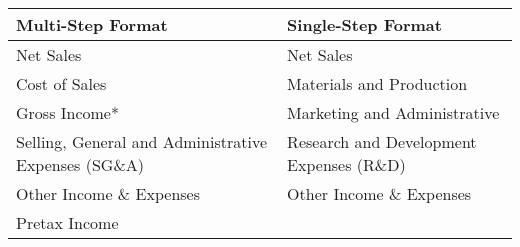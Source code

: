 \documentclass[]{book}
\theoremstyle{definition}
\theoremstyle{definition}
\theoremstyle{definition}
\theoremstyle{remark}
\begin{document}
\begin{longtable}[]{@{}ll@{}}
\toprule
\begin{minipage}[b]{0.18\columnwidth}\raggedright\strut
Multi-Step Format\strut
\end{minipage} & \begin{minipage}[b]{0.18\columnwidth}\raggedright\strut
Single-Step Format\strut
\end{minipage}\tabularnewline
\midrule
\endhead
\begin{minipage}[t]{0.18\columnwidth}\raggedright\strut
Net Sales\strut
\end{minipage} & \begin{minipage}[t]{0.18\columnwidth}\raggedright\strut
Net Sales\strut
\end{minipage}\tabularnewline
\begin{minipage}[t]{0.18\columnwidth}\raggedright\strut
Cost of Sales\strut
\end{minipage} & \begin{minipage}[t]{0.18\columnwidth}\raggedright\strut
Materials and Production\strut
\end{minipage}\tabularnewline
\begin{minipage}[t]{0.18\columnwidth}\raggedright\strut
Gross Income*\strut
\end{minipage} & \begin{minipage}[t]{0.18\columnwidth}\raggedright\strut
Marketing and Administrative\strut
\end{minipage}\tabularnewline
\begin{minipage}[t]{0.18\columnwidth}\raggedright\strut
Selling, General and Administrative Expenses (SG\&A)\strut
\end{minipage} & \begin{minipage}[t]{0.18\columnwidth}\raggedright\strut
Research and Development Expenses (R\&D)\strut
\end{minipage}\tabularnewline
\begin{minipage}[t]{0.18\columnwidth}\raggedright\strut
Other Income \& Expenses\strut
\end{minipage} & \begin{minipage}[t]{0.18\columnwidth}\raggedright\strut
Other Income \& Expenses\strut
\end{minipage}\tabularnewline
\begin{minipage}[t]{0.18\columnwidth}\raggedright\strut
Pretax Income\strut
\end{minipage} & \begin{minipage}[t]{0.18\columnwidth}\raggedright\strut

\end{minipage}
\end{longtable}
\end{document}
